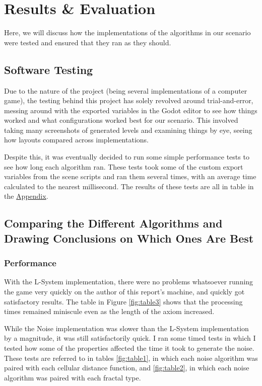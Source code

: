 \chapter{Results \& Evaluation} \label{Evaluation}

Here, we will discuss how the implementations of the algorithms in our scenario were tested and ensured that they ran as they should.

\section{Software Testing}

Due to the nature of the project (being several implementations of a computer game), the testing behind this project has solely revolved around trial-and-error, messing around with the exported variables in the Godot editor to see how things worked and what configurations worked best for our scenario. This involved taking many screenshots of generated levels and examining things by eye, seeing how layouts compared across implementations.

Despite this, it was eventually decided to run some simple performance tests to see how long each algorithm ran. These tests took some of the custom export variables from the scene scripts and ran them several times, with an average time calculated to the nearest millisecond. The results of these tests are all in table in the \hyperref[Appendix]{Appendix}.

\section{Comparing the Different Algorithms and Drawing Conclusions on Which Ones Are Best}

\subsection{Performance}

With the L-System implementation, there were no problems whatsoever running the game very quickly on the author of this report's machine, and quickly got satisfactory results. The table in Figure \ref{fig:table3} shows that the processing times remained miniscule even as the length of the axiom increased.

While the Noise implementation was slower than the L-System implementation by a magnitude, it was still satisfactorily quick. I ran some timed tests in which I tested how some of the properties affected the time it took to generate the noise. These tests are referred to in tables \ref{fig:table1}, in which each noise algorithm was paired with each cellular distance function, and \ref{fig:table2}, in which each noise algorithm was paired with each fractal type.

